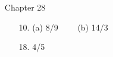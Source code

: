 \documentclass[12pt]{article}
\begin{document}
\begin{itemize}
%
%
%

\item[Chapter 28]         \label{ANS_28}
	\begin{itemize}
	\item[10.] (a) 8/9  \ \ \ \ (b) 14/3 \ \ \ \ 
	\item[18.] 4/5
	\end{itemize}


\end{itemize}
\end{document}
